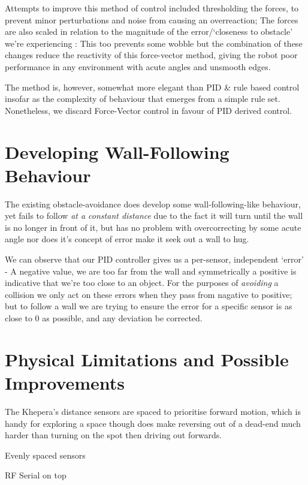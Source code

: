 \documentclass[11pt, a4paper]{article}
\begin{document}
Attempts to improve this method of control included thresholding the forces, to 
prevent minor perturbations and noise from causing an overreaction; The forces are 
also scaled in relation to the magnitude of the error/`closeness to obstacle' we're 
experiencing : This too prevents some wobble but the combination of these changes 
reduce the reactivity of this force-vector method, giving the robot poor performance 
in any environment with acute angles and unsmooth edges.

The method is, however, somewhat more elegant than PID \& rule based control insofar 
as the complexity of behaviour that emerges from a simple rule set. Nonetheless, we 
discard Force-Vector control in favour of PID derived control.


\section{Developing Wall-Following Behaviour}

The existing obstacle-avoidance does develop some wall-following-like behaviour, 
yet fails to follow \emph{at a constant distance} due to the fact it will turn until 
the wall is no longer in front of it, but has no problem with overcorrecting by 
some acute angle nor does it's concept of error make it seek out a wall to hug.

We can observe that our PID controller gives us a per-sensor, independent `error' - 
A negative value, we are too far from the wall and symmetrically a positive is 
indicative that we're too close to an object. For the purposes of \emph{avoiding} 
a collision we only act on these errors when they pass from nagative to positive; 
but to follow a wall we are trying to ensure the error for a specific sensor is 
as close to 0 as possible, and any deviation be corrected.


\section{Physical Limitations and Possible Improvements}

The Khepera's distance sensors are spaced to prioritise forward motion, which is handy 
for exploring a space though does make reversing out of a dead-end much harder than 
turning on the spot then driving out forwards.

Evenly spaced sensors

RF Serial on top
\end{document}
